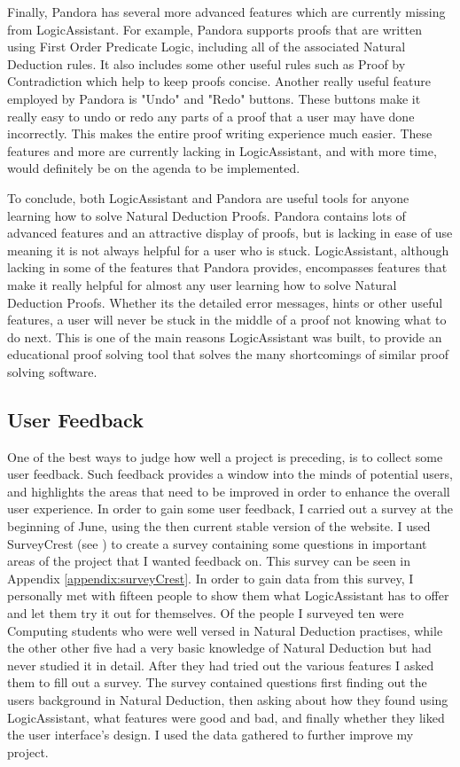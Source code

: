 Finally, Pandora has several more advanced features which are currently missing from LogicAssistant. For example, Pandora supports proofs that are written using First Order Predicate Logic, including all of the associated Natural Deduction rules. It also includes some other useful rules such as Proof by Contradiction which help to keep proofs concise. Another really useful feature employed by Pandora is "Undo" and "Redo" buttons. These buttons make it really easy to undo or redo any parts of a proof that a user may have done incorrectly. This makes the entire proof writing experience much easier. These features and more are currently lacking in LogicAssistant, and with more time, would definitely be on the agenda to be implemented.

To conclude, both LogicAssistant and Pandora are useful tools for anyone learning how to solve Natural Deduction Proofs. Pandora contains lots of advanced features and an attractive display of proofs, but is lacking in ease of use meaning it is not always helpful for a user who is stuck. LogicAssistant, although lacking in some of the features that Pandora provides, encompasses features that make it really helpful for almost any user learning how to solve Natural Deduction Proofs. Whether its the detailed error messages, hints or other useful features, a user will never be stuck in the middle of a proof not knowing what to do next. This is one of the main reasons LogicAssistant was built, to provide an educational proof solving tool that solves the many shortcomings of similar proof solving software.

\subsection{User Feedback \label{feedback}}

One of the best ways to judge how well a project is preceding, is to collect some user feedback. Such feedback provides a window into the minds of potential users, and highlights the areas that need to be improved in order to enhance the overall user experience. In order to gain some user feedback, I carried out a survey at the beginning of June, using the then current stable version of the website. I used SurveyCrest (see \cite{surveyCrest}) to create a survey containing some questions in important areas of the project that I wanted feedback on. This survey can be seen in Appendix \ref{appendix:surveyCrest}. In order to gain data from this survey, I personally met with fifteen people to show them what LogicAssistant has to offer and let them try it out for themselves. Of the people I surveyed ten were Computing students who were well versed in Natural Deduction practises, while the other other five had a very basic knowledge of Natural Deduction but had never studied it in detail. After they had tried out the various features I asked them to fill out a survey. The survey contained questions first finding out the users background in Natural Deduction, then asking about how they found using LogicAssistant, what features were good and bad, and finally whether they liked the user interface's design. I used the data gathered to further improve my project.

